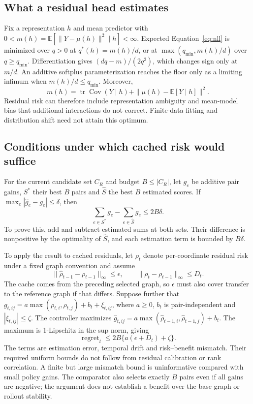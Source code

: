 \subsection{What a residual head estimates}
\label{sec:residual-moment}
Fix a representation $h$ and mean predictor with $0<m(h)=\mathbb E[\|Y-\mu(h)\|^2\mid h]<\infty$. Expected Equation~\ref{eq:nll} is minimized over $q>0$ at $q^*(h)=m(h)/d$, or at $\max(q_{\min},m(h)/d)$ over $q\ge q_{\min}$. Differentiation gives $(dq-m)/(2q^2)$, which changes sign only at $m/d$. An additive softplus parameterization reaches the floor only as a limiting infimum when $m(h)/d\le q_{\min}$. Moreover,
\begin{equation}
 m(h)=\operatorname{tr}\operatorname{Cov}(Y\mid h)+\|\mu(h)-\mathbb E[Y\mid h]\|^2.
\end{equation}
Residual risk can therefore include representation ambiguity and mean-model bias that additional interactions do not correct. Finite-data fitting and distribution shift need not attain this optimum.

\subsection{Conditions under which cached risk would suffice}
\label{sec:allocation-score-conditions}
For the current candidate set $C_R$ and budget $B\le|C_R|$, let $g_e$ be additive pair gains, $S^*$ their best $B$ pairs and $\widehat S$ the best $B$ estimated scores. If $\max_e|\widehat g_e-g_e|\le\delta$, then
\begin{equation}
 \sum_{e\in S^*}g_e-\sum_{e\in\widehat S}g_e\le2B\delta.
 \label{eq:regret}
\end{equation}
To prove this, add and subtract estimated sums at both sets. Their difference is nonpositive by the optimality of $\widehat S$, and each estimation term is bounded by $B\delta$.

To apply the result to cached residuals, let $\rho_t$ denote per-coordinate residual risk under a fixed graph convention and assume
\begin{equation}
 \|\widehat\rho_{t-1}-\rho_{t-1}\|_\infty\le\epsilon,
 \qquad \|\rho_t-\rho_{t-1}\|_\infty\le D_t.
\end{equation}
The cache comes from the preceding selected graph, so $\epsilon$ must also cover transfer to the reference graph if that differs. Suppose further that
$g_{t,ij}=a\max(\rho_{t,i},\rho_{t,j})+b_t+\xi_{t,ij}$,
where $a\ge0$, $b_t$ is pair-independent and $|\xi_{t,ij}|\le\zeta$.
The controller maximizes $\widehat g_{t,ij}=a\max(\widehat\rho_{t-1,i},\widehat\rho_{t-1,j})+b_t$. The maximum is 1-Lipschitz in the sup norm, giving
\begin{equation}
 \operatorname{regret}_t\le2B\{a(\epsilon+D_t)+\zeta\}.
\end{equation}
The terms are estimation error, temporal drift and risk--benefit mismatch. Their required uniform bounds do not follow from residual calibration or rank correlation. A finite but large mismatch bound is uninformative compared with small policy gains. The comparator also selects exactly $B$ pairs even if all gains are negative; the argument does not establish a benefit over the base graph or rollout stability.

